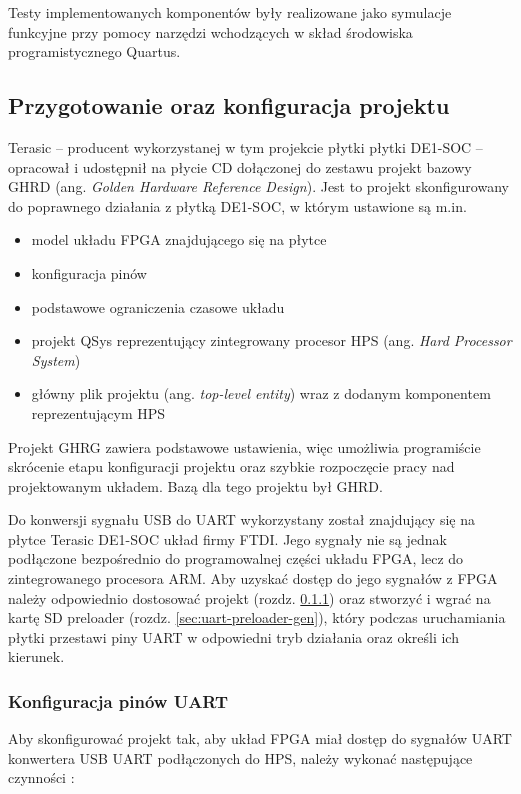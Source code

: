 Testy implementowanych komponentów były realizowane jako symulacje funkcyjne przy pomocy narzędzi wchodzących w skład środowiska programistycznego Quartus.


\subsection{Przygotowanie oraz konfiguracja projektu}
\label{sec:przygotowanie-projektu}

Terasic -- producent wykorzystanej w tym projekcie płytki płytki DE1-SOC -- opracował i udostępnił na płycie CD dołączonej do zestawu \cite{terasic-cd} projekt bazowy GHRD (ang. \textit{Golden Hardware Reference Design}). Jest to projekt skonfigurowany do poprawnego działania z płytką DE1-SOC, w którym ustawione są m.in.
\begin{itemize}[noitemsep]
\item model układu FPGA znajdującego się na płytce
\item konfiguracja pinów
\item podstawowe ograniczenia czasowe układu
\item projekt QSys reprezentujący zintegrowany procesor HPS (ang. \textit{Hard Processor System})
\item główny plik projektu (ang. \textit{top-level entity}) wraz z dodanym komponentem reprezentującym HPS
\end{itemize}
Projekt GHRG zawiera podstawowe ustawienia, więc umożliwia programiście skrócenie etapu konfiguracji projektu oraz szybkie rozpoczęcie pracy nad projektowanym układem. Bazą dla tego projektu był GHRD.

Do konwersji sygnału USB do UART wykorzystany został znajdujący się na płytce Terasic DE1-SOC układ firmy FTDI. Jego sygnały nie są jednak podłączone bezpośrednio do programowalnej części układu FPGA, lecz do zintegrowanego procesora ARM. Aby uzyskać dostęp do jego sygnałów z FPGA należy odpowiednio dostosować projekt (rozdz. \ref{sec:uart-qsys}) oraz stworzyć i wgrać na kartę SD preloader (rozdz. \ref{sec:uart-preloader-gen}), który podczas uruchamiania płytki przestawi piny UART w odpowiedni tryb działania oraz określi ich kierunek.

\subsubsection{Konfiguracja pinów UART}
\label{sec:uart-qsys}
Aby skonfigurować projekt tak, aby układ FPGA miał dostęp do sygnałów UART konwertera USB UART podłączonych do HPS, należy wykonać następujące czynności \cite{altera-youtube-loanerio, altera-forum-fgga-hps-access, altera-forum-cant-rx}:

